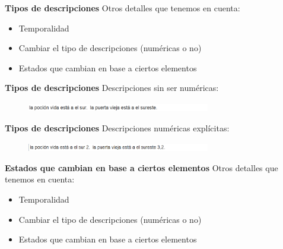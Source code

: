
\begin{tframe}{\textbf{Tipos de descripciones}}
	Otros detalles que tenemos en cuenta:
	\begin{itemize}
		\item Temporalidad
		\item<+-| alert@+> Cambiar el tipo de descripciones (numéricas o no)
		\item Estados que cambian en base a ciertos elementos
	\end{itemize}
\end{tframe}

\begin{tframe}{\textbf{Tipos de descripciones}}
	Descripciones sin ser numéricas:
		\begin{figure}[h]
			\includegraphics[width=8cm]{../img/descripcionnonumerica.PNG}
		\end{figure}
\end{tframe}

\begin{tframe}{\textbf{Tipos de descripciones}}
	Descripciones numéricas explícitas:
		\begin{figure}[h]
			\includegraphics[width=8cm]{../img/descripcionnumerica.PNG}
		\end{figure}
\end{tframe}


\begin{tframe}{\textbf{Estados que cambian en base a ciertos elementos}}
	Otros detalles que tenemos en cuenta:
	\begin{itemize}
		\item Temporalidad
		\item Cambiar el tipo de descripciones (numéricas o no)
		\item<+-| alert@+> Estados que cambian en base a ciertos elementos
	\end{itemize}
\end{tframe}

